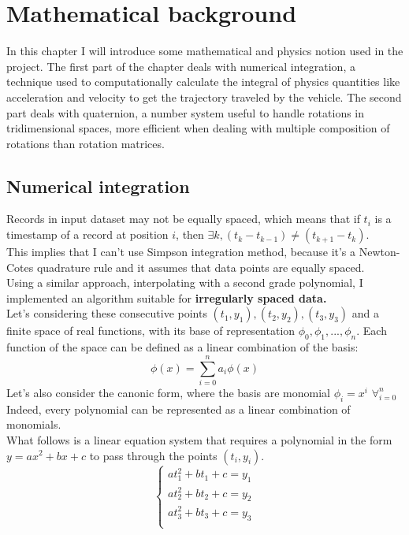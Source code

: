 \chapter{Mathematical background}
\label{chap:math_background}

In this chapter I will introduce some mathematical and physics notion used in the project.
The first part of the chapter deals with numerical integration, a technique used to computationally calculate the integral of physics quantities like acceleration and velocity to get the trajectory traveled by the vehicle.
The second part deals with quaternion, a number system useful to handle rotations in tridimensional spaces, more efficient when dealing with multiple composition of rotations than rotation matrices.
\\
\section{Numerical integration}
Records in input dataset may not be equally spaced, which means that if $t_i$ is a timestamp of a record at position $i$, then $\exists k, (t_{k}-t_{k-1})\neq (t_{k+1}-t_k)$. \\
This implies that I can't use Simpson integration method, because it's a Newton-Cotes quadrature rule and it assumes that data points are equally spaced. \cite{casciola} \\
Using a similar approach, interpolating with a second grade polynomial, I implemented an algorithm suitable for \textbf{irregularly spaced data.} \cite{integrating-irregularly} \\
Let's considering these consecutive points $(t_1,y_1),(t_2,y_2),(t_3,y_3)$ and a finite space of real functions, with its base of representation $\phi_0,\phi_1,...,\phi_n$.
Each function of the space can be defined as a linear combination of the basis:
$$ \phi(x) = \sum_{i=0}^n a_i \phi (x)$$ 
Let's also consider the canonic form, where the basis are monomial $\phi_i=x^i$ $\forall_{i=0}^n$ \\
Indeed, every polynomial can be represented as a linear combination of monomials. \\
What follows is a linear equation system that requires a polynomial in the form $y=ax^2+bx+c$ to pass through the points $(t_i,y_i)$.
$$
\begin{cases}
at_1^2 + bt_1 + c = y_1 \\
at_2^2 + bt_2 + c = y_2 \\
at_3^2 + bt_3 + c = y_3 \\
\end{cases}
$$
